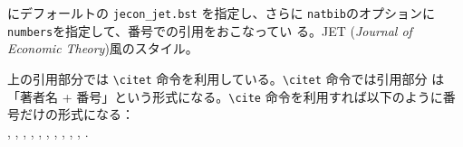 \documentclass[10pt]{jarticle}
\begin{document}
\verb|| にデフォールトの \verb|jecon_jet.bst| を指定し、さらに
\verb|natbib|のオプションに\verb|numbers|を指定して、番号での引用をおこなってい
る。JET (\textit{Journal of Economic Theory})風のスタイル。
\vspace{1em}\\



\vspace{1em}

上の引用部分では \verb|\citet| 命令を利用している。\verb|\citet| 命令では引用部分
は「著者名 + 番号」という形式になる。\verb|\cite| 命令を利用すれば以下のように番
号だけの形式になる：\\
\cite{40020418914}, \cite{yamazaki13:_japan},
\cite{takeda2013jecon}, \cite{Takeda2012a}, \cite{arimura-takeda2012},
\cite{matloff__2012}, \cite{Boswell-2012}, \cite{takeda2012_cge},
\cite{Takeda2011b}, \cite{takeda2011c}, \cite{40018847518}.

\nocite{*}


% 

%

\end{document}
